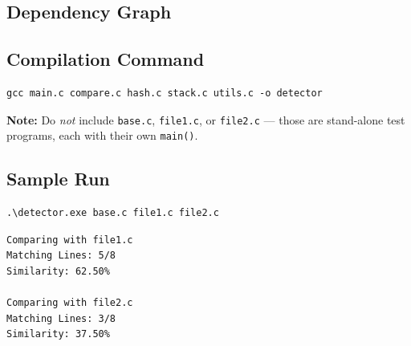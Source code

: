 \documentclass[12pt,a4paper]{article}
\begin{document}
\subsection{Dependency Graph}

\begin{center}
\end{center}

\subsection{Compilation Command}

\begin{lstlisting}[style=bashstyle, caption={Compile the project with GCC}]
gcc main.c compare.c hash.c stack.c utils.c -o detector
\end{lstlisting}

\textbf{Note:} Do \emph{not} include \texttt{base.c}, \texttt{file1.c}, or \texttt{file2.c} — those are stand-alone test programs, each with their own \texttt{main()}.

\subsection{Sample Run}

\begin{lstlisting}[style=bashstyle, caption={Running on Windows PowerShell}]
.\detector.exe base.c file1.c file2.c
\end{lstlisting}

\begin{lstlisting}[style=bashstyle, caption={Example output}]
Comparing with file1.c
Matching Lines: 5/8
Similarity: 62.50%

Comparing with file2.c
Matching Lines: 3/8
Similarity: 37.50%
\end{lstlisting}
\end{document}
